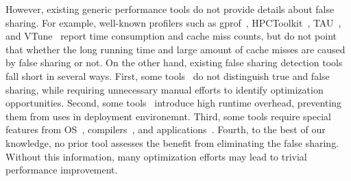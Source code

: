 However, existing generic performance tools do not provide details about false sharing. For example, well-known profilers such as gprof~\cite{gprof}, HPCToolkit~\cite{ibs-sc}, TAU~\cite{Malony-etal:2008:TAU}, and VTune~\cite{Intel:VTune} report time consumption and cache miss counts, but do not point that whether the long running time and large amount of cache misses are caused by false sharing or not. On the other hand, existing false sharing detection tools fall short in several ways. First, some tools~\cite{falseshare:binaryinstrumentation1,detect:ptu,detect:intel,falseshare:binaryinstrumentation2,DProf, qinzhao, OSdetection, mldetect, Wicaksono11detectingfalse, openmp} do not distinguish true and false sharing, while requiring unnecessary manual efforts to identify optimization opportunities. Second, some tools~\cite{falseshare:binaryinstrumentation1,falseshare:binaryinstrumentation2,falseshare:simulator, Predator} introduce high runtime overhead, preventing them from uses in deployment environemnt. Third, some tools require special features from OS~\cite{OSdetection}, compilers~\cite{Predator}, and applications~\cite{Sheriff}. Fourth, to the best of our knowledge, no prior tool assesses the benefit from eliminating the false sharing. Without this information, many optimization efforts may lead to trivial performance improvement.

\vspace{0.2in}

